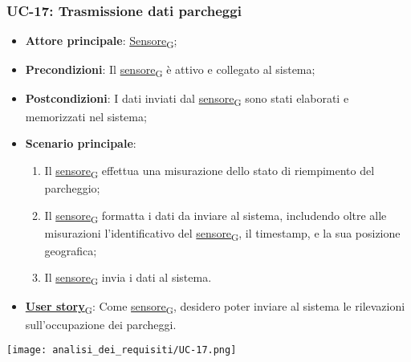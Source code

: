 \subsubsection{UC-17: Trasmissione dati parcheggi}
\begin{itemize}
	\item \textbf{Attore principale}: \href{https://7last.github.io/docs/rtb/documentazione-interna/glossario\#sensore}{Sensore\textsubscript{G}};
	\item \textbf{Precondizioni}: Il \href{https://7last.github.io/docs/rtb/documentazione-interna/glossario\#sensore}{sensore\textsubscript{G}} è attivo e collegato al sistema;
	\item \textbf{Postcondizioni}: I dati inviati dal \href{https://7last.github.io/docs/rtb/documentazione-interna/glossario\#sensore}{sensore\textsubscript{G}} sono stati elaborati e memorizzati nel sistema;
	\item \textbf{Scenario principale}:
	      \begin{enumerate}
		      \item Il \href{https://7last.github.io/docs/rtb/documentazione-interna/glossario\#sensore}{sensore\textsubscript{G}} effettua una misurazione dello stato di riempimento del parcheggio;
		      \item Il \href{https://7last.github.io/docs/rtb/documentazione-interna/glossario\#sensore}{sensore\textsubscript{G}} formatta i dati da inviare al sistema, includendo oltre alle misurazioni l'identificativo del \href{https://7last.github.io/docs/rtb/documentazione-interna/glossario\#sensore}{sensore\textsubscript{G}},
		            il timestamp, e la sua posizione geografica;
		      \item Il \href{https://7last.github.io/docs/rtb/documentazione-interna/glossario\#sensore}{sensore\textsubscript{G}} invia i dati al sistema.
	      \end{enumerate}
	\item \href{https://7last.github.io/docs/rtb/documentazione-interna/glossario\#user-story}{\textbf{User story}\textsubscript{G}}: Come \href{https://7last.github.io/docs/rtb/documentazione-interna/glossario\#sensore}{sensore\textsubscript{G}}, desidero poter inviare al sistema le rilevazioni sull'occupazione dei parcheggi.
\end{itemize}

\begin{center}
	\texttt{[image: analisi\_dei\_requisiti/UC-17.png]}
\end{center}

